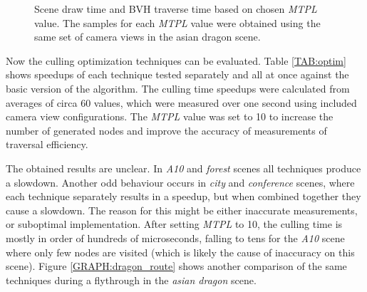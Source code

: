 \documentclass[report,11pt]{elsarticle}
\begin{document}
\begin{figure}[H]
\begin{center}
\caption{Scene draw time and BVH traverse time based on chosen \emph{MTPL} value. The samples for each \emph{MTPL} value were obtained using the same set of camera views in the asian dragon scene.}
\label{GRAPH:mtpl}
\end{center}
\end{figure}

Now the culling optimization techniques can be evaluated. Table \ref{TAB:optim} shows speedups of each technique tested separately and all at once against the basic version of the algorithm. The culling time speedups were calculated from averages of circa 60 values, which were measured over one second using included camera view configurations. The \emph{MTPL} value was set to 10 to increase the number of generated nodes and improve the accuracy of measurements of traversal efficiency.

The obtained results are unclear. In \emph{A10} and \emph{forest} scenes all techniques produce a slowdown. Another odd behaviour occurs in \emph{city} and \emph{conference} scenes, where each technique separately results in a speedup, but when combined together they cause a slowdown. The reason for this might be either inaccurate measurements, or suboptimal implementation. After setting \emph{MTPL} to 10, the culling time is mostly in order of hundreds of microseconds, falling to tens for the \emph{A10} scene where only few nodes are visited (which is likely the cause of inaccuracy on this scene). Figure \ref{GRAPH:dragon_route} shows another comparison of the same techniques during a flythrough in the \emph{asian dragon} scene. 
\end{document}
